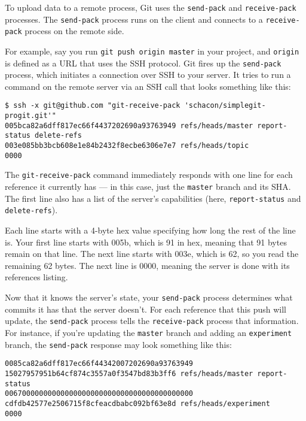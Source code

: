 \documentclass[a4paper]{book}
\begin{document}
To upload data to a remote process, Git uses the \texttt{send-pack} and \texttt{receive-pack} processes. The \texttt{send-pack} process runs on the client and connects to a \texttt{receive-pack} process on the remote side.

For example, say you run \texttt{git push origin master} in your project, and \texttt{origin} is defined as a URL that uses the SSH protocol. Git fires up the \texttt{send-pack} process, which initiates a connection over SSH to your server. It tries to run a command on the remote server via an SSH call that looks something like this:

\begin{shaded}\begin{verbatim}
$ ssh -x git@github.com "git-receive-pack 'schacon/simplegit-progit.git'"
005bca82a6dff817ec66f4437202690a93763949 refs/heads/master report-status delete-refs
003e085bb3bcb608e1e84b2432f8ecbe6306e7e7 refs/heads/topic
0000
\end{verbatim}\end{shaded}

The \texttt{git-receive-pack} command immediately responds with one line for each reference it currently has --- in this case, just the \texttt{master} branch and its SHA. The first line also has a list of the server's capabilities (here, \texttt{report-status} and \texttt{delete-refs}).

Each line starts with a 4-byte hex value specifying how long the rest of the line is. Your first line starts with 005b, which is 91 in hex, meaning that 91 bytes remain on that line. The next line starts with 003e, which is 62, so you read the remaining 62 bytes. The next line is 0000, meaning the server is done with its references listing.

Now that it knows the server's state, your \texttt{send-pack} process determines what commits it has that the server doesn't. For each reference that this push will update, the \texttt{send-pack} process tells the \texttt{receive-pack} process that information. For instance, if you're updating the \texttt{master} branch and adding an \texttt{experiment} branch, the \texttt{send-pack} response may look something like this:

\begin{shaded}\begin{verbatim}
0085ca82a6dff817ec66f44342007202690a93763949  15027957951b64cf874c3557a0f3547bd83b3ff6 refs/heads/master report-status
00670000000000000000000000000000000000000000 cdfdb42577e2506715f8cfeacdbabc092bf63e8d refs/heads/experiment
0000
\end{verbatim}\end{shaded}
\end{document}
